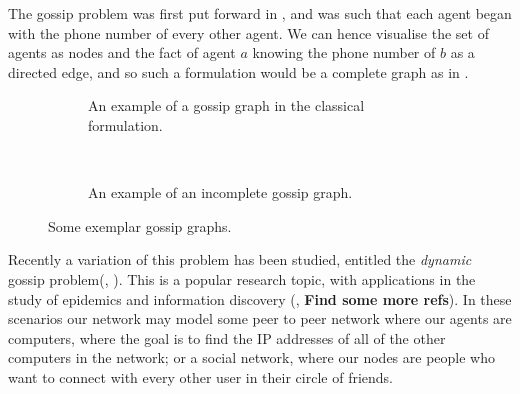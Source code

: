 \documentclass[12pt, a4paper]{article}
\begin{document}
The gossip problem was first put forward in \cite{Tijdeman:1971}, and was such
that each agent began with the phone number of every other agent. We can hence
visualise the set of agents as nodes and the fact of agent $a$ knowing the phone
number of $b$ as a directed edge, and so such a formulation would be a complete
graph as in .

\bigskip

\begin{figure}[h]
  \centering
  \begin{subfigure}[c]{0.4\textwidth}
    \centering
    \caption{An example of a gossip graph in the classical formulation.}
    \label{fig:classicgossipex}
  \end{subfigure}%
  ~
  \begin{subfigure}[c] {0.4\textwidth}
    \centering
    \caption{An example of an incomplete gossip graph. }
    \label{fig:dynamicgossipex}

  \end{subfigure}
  \caption{Some exemplar gossip graphs.}
\end{figure}

Recently a variation of this problem has been studied, entitled the
\textit{dynamic} gossip problem(\cite{DynamicGossip}, \cite{EpProforDyGo}). This
is a popular research topic, with applications in the study of epidemics and
information discovery (\cite{DiscoverythruGossip}, \textbf{Find some more
  refs}). In these scenarios our network may model some peer to peer network
where our agents are computers, where the goal is to find the IP addresses of
all of the other computers in the network; or a social network, where our nodes
are people who want to connect with every other user in their circle of friends. 
\end{document}
